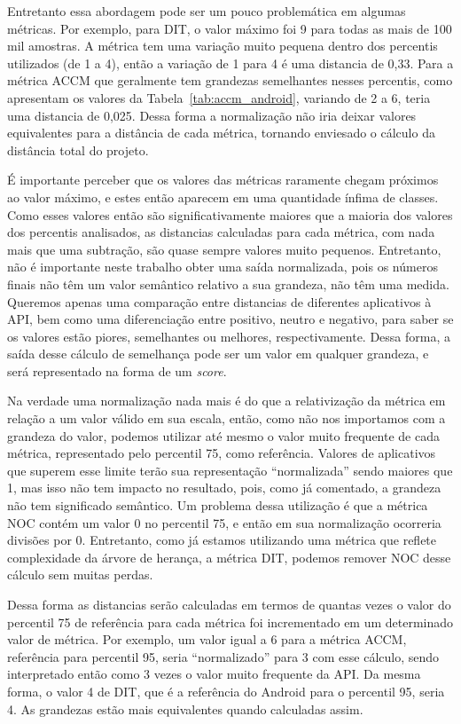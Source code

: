 Entretanto essa abordagem pode ser um pouco problemática em algumas métricas. Por exemplo, para DIT, o valor máximo foi 9 para todas as mais de 100 mil amostras. A métrica tem uma variação muito pequena dentro dos percentis utilizados (de 1 a 4), então a variação de 1 para 4 é uma distancia de 0,33. Para a métrica ACCM que geralmente tem grandezas semelhantes nesses percentis, como apresentam os valores da Tabela~\ref{tab:accm_android}, variando de 2 a 6, teria uma distancia de 0,025. Dessa forma a normalização não iria deixar valores equivalentes para a distância de cada métrica, tornando enviesado o cálculo da distância total do projeto.

É importante perceber que os valores das métricas raramente chegam próximos ao valor máximo, e estes então aparecem em uma quantidade ínfima de classes. Como esses valores então são significativamente maiores que a maioria dos valores dos percentis analisados, as distancias calculadas para cada métrica, com nada mais que uma subtração, são quase sempre valores muito pequenos. Entretanto, não é importante neste trabalho obter uma saída normalizada, pois os números finais não têm um valor semântico relativo a sua grandeza, não têm uma medida. Queremos apenas uma comparação entre distancias de diferentes aplicativos à API, bem como uma diferenciação entre positivo, neutro e negativo, para saber se os valores estão piores, semelhantes ou melhores, respectivamente. Dessa forma, a saída desse cálculo de semelhança pode ser um valor em qualquer grandeza, e será representado na forma de um \textit{score}.

Na verdade uma normalização nada mais é do que a relativização da métrica em relação a um valor válido em sua escala, então, como não nos importamos com a grandeza do valor, podemos utilizar até mesmo o valor muito frequente de cada métrica, representado pelo percentil 75, como referência. Valores de aplicativos que superem esse limite terão sua representação ``normalizada'' sendo maiores que 1, mas isso não tem impacto no resultado, pois, como já comentado, a grandeza não tem significado semântico. Um problema dessa utilização é que a métrica NOC contém um valor 0 no percentil 75, e então em sua normalização ocorreria divisões por 0. Entretanto, como já estamos utilizando uma métrica que reflete complexidade da árvore de herança, a métrica DIT, podemos remover NOC desse cálculo sem muitas perdas.

Dessa forma as distancias serão calculadas em termos de quantas vezes o valor do percentil 75 de referência para cada métrica foi incrementado em um determinado valor de métrica. Por exemplo, um valor igual a 6 para a métrica ACCM, referência para percentil 95, seria ``normalizado'' para 3 com esse cálculo, sendo interpretado então como 3 vezes o valor muito frequente da API. Da mesma forma, o valor 4 de DIT, que é a referência do Android para o percentil 95, seria 4. As grandezas estão mais equivalentes quando calculadas assim.

